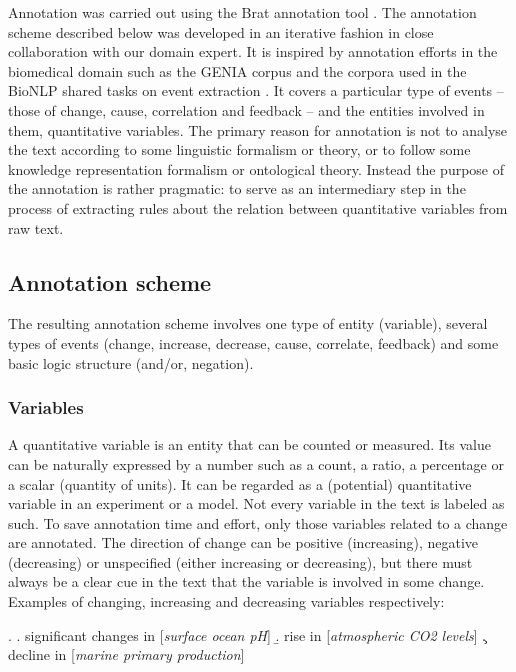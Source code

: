 \documentclass[10pt, a4paper]{article}
\begin{document}
Annotation was carried out using the Brat annotation tool \cite{stenetorp2012}.
The annotation scheme described below was developed in an iterative fashion in close collaboration with our domain expert.
It is inspired by annotation efforts in the biomedical domain such as the GENIA corpus \cite{Kim2003GENIA} and the corpora used in the BioNLP shared tasks on event extraction \cite{Kim2009Overview}.
It covers a particular type of events -- those of change, cause, correlation and feedback -- and the entities involved in them, quantitative variables.
The primary reason for annotation is not to analyse the text according to some linguistic formalism or theory, or to follow some knowledge representation formalism or ontological theory.
Instead the purpose of the annotation is rather pragmatic: to serve as an intermediary step in the process of extracting rules about the relation between quantitative variables from raw text.      
 
\subsection{Annotation scheme}

The resulting annotation scheme involves one type of entity (variable), several types of events (change, increase, decrease, cause, correlate, feedback) and some basic logic structure (and/or, negation).  


\subsubsection{Variables}

A quantitative variable is an entity that can be counted or measured.
Its value can be naturally expressed by a number such as a count, a ratio, a percentage or a scalar (quantity of units).
It can be regarded as a (potential) quantitative variable in an experiment or a model. 
Not every variable in the text is labeled as such.
To save annotation time and effort, only those variables related to a change are annotated.
The  direction of change can be positive (increasing), negative (decreasing) or unspecified (either increasing or decreasing), but there must always be a clear cue in the text that the variable is involved in some change. 
Examples of changing, increasing and decreasing variables respectively:

\ex.
  \a. significant changes in [\emph{surface ocean pH}]
  \b. rise in [\emph{atmospheric CO2 levels}]
  \c. decline in [\emph{marine primary production}]
\end{document}
